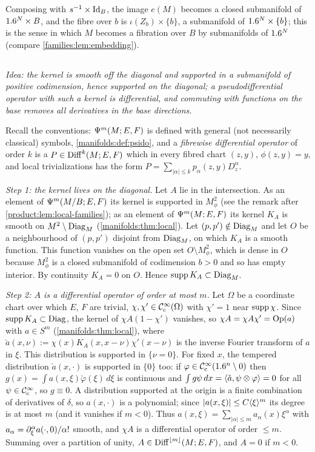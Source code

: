 Composing with $s^{-1}\times\operatorname{Id}_B$, the image $e(M)$ becomes a closed submanifold
of $1.6^N\times B$, and the fibre over $b$ is $\iota(Z_b)\times\{b\}$, a submanifold
of $1.6^N\times\{b\}$; this is the sense in which $M$ becomes a fibration over $B$
by submanifolds of $1.6^N$ (compare \cref{families:lem:embedding}).

\subsection*{}
\emph{Idea: the kernel is smooth off the diagonal and supported in a submanifold of
positive codimension, hence supported on the diagonal; a pseudodifferential
operator with such a kernel is differential, and commuting with functions on the
base removes all derivatives in the base directions.}

Recall the conventions: $\Psi^{m}(M;E,F)$ is defined with general (not necessarily
classical) symbols, \cref{manifolds:def:psido}, and a \emph{fibrewise differential
operator} of order $k$ is a $P\in\operatorname{Diff}^{k}(M;E,F)$ which in every fibred chart
$(z,y)$, $\phi(z,y)=y$, and local trivializations has the form
$P=\sum_{|\alpha|\le k}p_\alpha(z,y)D_z^\alpha$.

\emph{Step 1: the kernel lives on the diagonal.} Let $A$ lie in the intersection.
As an element of $\Psi^{m}(M/B;E,F)$ its kernel is supported in $M^2_\phi$ (see the
remark after \cref{product:lem:local-families}); as an element of $\Psi^{m}(M;E,F)$
its kernel $K_A$ is smooth on $M^2\setminus\operatorname{Diag}_M$ (\cref{manifolds:thm:local}).
Let $(p,p')\notin\operatorname{Diag}_M$ and let $O$ be a neighbourhood of $(p,p')$ disjoint from
$\operatorname{Diag}_M$, on which $K_A$ is a smooth function. This function vanishes on the open
set $O\setminus M^2_\phi$, which is dense in $O$ because $M^2_\phi$ is a closed
submanifold of codimension $b>0$ and so has empty interior. By continuity
$K_A=0$ on $O$. Hence $\operatorname{supp} K_A\subset\operatorname{Diag}_M$.

\emph{Step 2: $A$ is a differential operator of order at most $m$.} Let $\Omega$ be a
coordinate chart over which $E$, $F$ are trivial, $\chi,\chi'\in\mathcal{C}^\infty_{\mathrm{c}}(\Omega)$ with
$\chi'=1$ near $\operatorname{supp}\chi$. Since $\operatorname{supp} K_A\subset\operatorname{Diag}$, the kernel of
$\chi A(1-\chi')$ vanishes, so $\chi A=\chi A\chi'=\operatorname{Op}(a)$ with
$a\in S^m$ (\cref{manifolds:thm:local}), where
$\check a(x,\nu):=\chi(x)K_A(x,x-\nu)\chi'(x-\nu)$ is the inverse Fourier transform
of $a$ in $\xi$. This distribution is supported in $\{\nu=0\}$. For fixed $x$, the
tempered distribution $\check a(x,\cdot)$ is supported in $\{0\}$ too: if
$\varphi\in\mathcal{C}^\infty_{\mathrm{c}}(1.6^n\setminus0)$ then $g(x)=\int a(x,\xi)\check\varphi(\xi)\,d\xi$ is
continuous and $\int g\psi\,dx=\langle \check a, \psi\otimes\varphi\rangle=0$ for all
$\psi\in\mathcal{C}^\infty_{\mathrm{c}}$, so $g\equiv0$. A distribution supported at the origin is a finite
combination of derivatives of $\delta$, so $a(x,\cdot)$ is a polynomial; since
$|a(x,\xi)|\le C\langle \xi\rangle^m$ its degree is at most $m$ (and it vanishes if $m<0$).
Thus $a(x,\xi)=\sum_{|\alpha|\le m}a_\alpha(x)\xi^\alpha$ with
$a_\alpha=\partial_\xi^\alpha a(\cdot,0)/\alpha!$ smooth, and $\chi A$ is a differential
operator of order $\le m$. Summing over a partition of unity, $A\in\operatorname{Diff}^{\lfloor
m\rfloor}(M;E,F)$, and $A=0$ if $m<0$.

